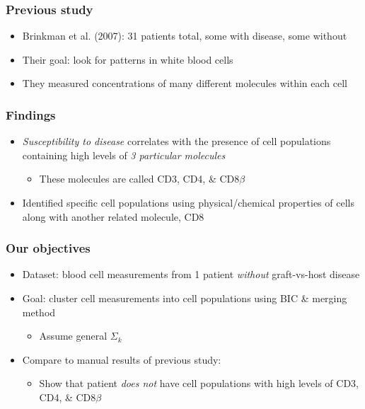 \documentclass[mathserif,compress]{beamer}
\renewcommand\;{\,}
\begin{document}
\begin{frame}\frametitle{Previous study}
\begin{itemize}
\item[]
\alert{Brinkman et al. (2007):} 31 patients total, some with disease, some without
\bigskip
\item[]
\alert{Their goal:} look for patterns in white blood cells
\bigskip
\item[]
They measured concentrations of many different molecules within each cell
\end{itemize}
\end{frame}

\begin{frame}\frametitle{Findings}
\begin{itemize}
\item
\emph{Susceptibility to disease} correlates with the presence of cell populations containing high levels of \emph{3 particular molecules}
\bigskip
\begin{itemize}
\item
These molecules are called CD3, CD4, \& CD8$\beta$
\end{itemize}
\bigskip
\item
Identified specific cell populations using physical/chemical properties of cells along with another related molecule, CD8
\end{itemize}
\end{frame}

\begin{frame}\frametitle{Our objectives}
\begin{itemize}
\item[]
\alert{Dataset:}
 blood cell measurements from 1 patient \emph{without} graft-vs-host disease
\bigskip
\item[]
\alert{Goal:} cluster cell measurements into cell populations using BIC \& merging method
\bigskip
\begin{itemize}
\item
Assume general $\Sigma_k$
\end{itemize}
\bigskip
\item[]
Compare to manual results of previous study:
\bigskip
\begin{itemize}
\item
Show that patient \emph{does not} have cell populations with high levels of CD3, CD4, \& CD8$\beta$
\end{itemize}
\end{itemize}
\end{frame}
\end{document}
